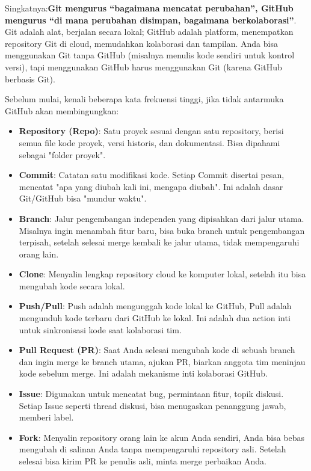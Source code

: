 Singkatnya:\textbf{Git mengurus “bagaimana mencatat perubahan”, GitHub mengurus “di mana perubahan disimpan, bagaimana berkolaborasi”}. Git adalah alat, berjalan secara lokal; GitHub adalah platform, menempatkan repository Git di cloud, memudahkan kolaborasi dan tampilan. Anda bisa menggunakan Git tanpa GitHub (misalnya menulis kode sendiri untuk kontrol versi), tapi menggunakan GitHub harus menggunakan Git (karena GitHub berbasis Git).



Sebelum mulai, kenali beberapa kata frekuensi tinggi, jika tidak antarmuka GitHub akan membingungkan:

\begin{itemize}
  \item \textbf{Repository (Repo)}: Satu proyek sesuai dengan satu repository, berisi semua file kode proyek, versi historis, dan dokumentasi. Bisa dipahami sebagai "folder proyek".
  \item \textbf{Commit}: Catatan satu modifikasi kode. Setiap Commit disertai pesan, mencatat "apa yang diubah kali ini, mengapa diubah". Ini adalah dasar Git/GitHub bisa "mundur waktu".
  \item \textbf{Branch}: Jalur pengembangan independen yang dipisahkan dari jalur utama. Misalnya ingin menambah fitur baru, bisa buka branch untuk pengembangan terpisah, setelah selesai merge kembali ke jalur utama, tidak mempengaruhi orang lain.
  \item \textbf{Clone}: Menyalin lengkap repository cloud ke komputer lokal, setelah itu bisa mengubah kode secara lokal.
  \item \textbf{Push/Pull}: Push adalah mengunggah kode lokal ke GitHub, Pull adalah mengunduh kode terbaru dari GitHub ke lokal. Ini adalah dua action inti untuk sinkronisasi kode saat kolaborasi tim.
  \item \textbf{Pull Request (PR)}: Saat Anda selesai mengubah kode di sebuah branch dan ingin merge ke branch utama, ajukan PR, biarkan anggota tim meninjau kode sebelum merge. Ini adalah mekanisme inti kolaborasi GitHub.
  \item \textbf{Issue}: Digunakan untuk mencatat bug, permintaan fitur, topik diskusi. Setiap Issue seperti thread diskusi, bisa menugaskan penanggung jawab, memberi label.
  \item \textbf{Fork}: Menyalin repository orang lain ke akun Anda sendiri, Anda bisa bebas mengubah di salinan Anda tanpa mempengaruhi repository asli. Setelah selesai bisa kirim PR ke penulis asli, minta merge perbaikan Anda.
\end{itemize}

